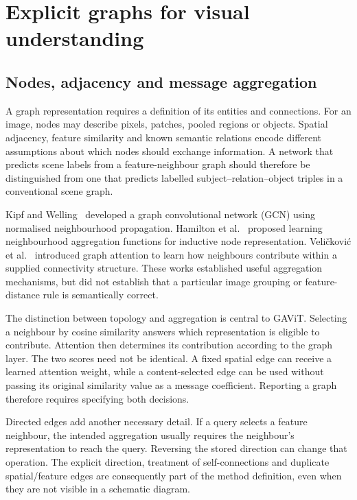 \section{Explicit graphs for visual understanding}

\subsection{Nodes, adjacency and message aggregation}

A graph representation requires a definition of its entities and connections.
For an image, nodes may describe pixels, patches, pooled regions or objects.
Spatial adjacency, feature similarity and known semantic relations encode
different assumptions about which nodes should exchange information. A
network that predicts scene labels from a feature-neighbour graph should
therefore be distinguished from one that predicts labelled subject--relation--object
triples in a conventional scene graph.

Kipf and Welling~\cite{kipf2017gcn} developed a graph convolutional network
(GCN) using normalised neighbourhood propagation. Hamilton
et al.~\cite{hamilton2017graphsage} proposed learning neighbourhood
aggregation functions for inductive node representation. Veli\v{c}kovi\'{c}
et al.~\cite{velickovic2018gat} introduced graph attention to learn how
neighbours contribute within a supplied connectivity structure. These works
established useful aggregation mechanisms, but did not establish that a
particular image grouping or feature-distance rule is semantically correct.

The distinction between topology and aggregation is central to GAViT.
Selecting a neighbour by cosine similarity answers which representation is
eligible to contribute. Attention then determines its contribution according
to the graph layer. The two scores need not be identical. A fixed spatial
edge can receive a learned attention weight, while a content-selected edge
can be used without passing its original similarity value as a message
coefficient. Reporting a graph therefore requires specifying both decisions.

Directed edges add another necessary detail. If a query selects a feature
neighbour, the intended aggregation usually requires the neighbour's
representation to reach the query. Reversing the stored direction can change
that operation. The explicit direction, treatment of self-connections and
duplicate spatial/feature edges are consequently part of the method
definition, even when they are not visible in a schematic diagram.

